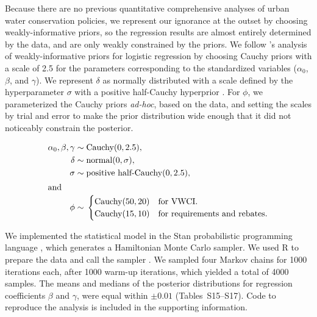 \documentclass[draft,linenumbers]{agujournal}
\begin{document}
Because there are no previous quantitative comprehensive analyses of urban
water conservation policies, we represent our ignorance at the outset by
choosing weakly-informative priors, so the regression results are almost
entirely determined by the data, and are only weakly constrained by the priors.
We follow \citet{gelman:prior:2008}'s analysis
of weakly-informative priors for logistic regression
by choosing Cauchy priors with a scale of 2.5 for the
parameters corresponding to the standardized variables ($\alpha_0$, $\beta$,
and $\gamma$).
We represent $\delta$ as normally distributed
with a scale defined by the hyperparameter $\sigma$ with a positive half-Cauchy
hyperprior \citep{gelman:prior:2008}.
For $\phi$, we parameterized the Cauchy priors
\emph{ad-hoc}, based on the data, and setting the scales by trial and error
to make the prior distribution wide enough that it did not noticeably constrain
the posterior.
\begin{linenomath*}
\begin{align}
\alpha_0, \beta, \gamma \sim{} & \text{Cauchy}(0,2.5),\\
\delta \sim{}& \text{normal}(0,\sigma),\\
\sigma \sim{}& \text{positive half-Cauchy}(0,2.5),\\
\intertext{and}
\phi \sim{}& \begin{cases}
\text{Cauchy}(50,20) & \text{for VWCI}. \\
\text{Cauchy}(15,10) & \text{for requirements and rebates}. \\
\end{cases}
\end{align}
\end{linenomath*}

We implemented the statistical model in the Stan probabilistic programming
language \citep{carpenter:stan:2016}, which generates a Hamiltonian Monte Carlo
sampler.
We used R to prepare the data and call the sampler \citep{r.manual:2016}.
We
sampled four Markov chains for 1000 iterations each, after 1000 warm-up iterations,
which yielded a total of 4000 samples.
The means and medians of the posterior distributions for
regression coefficients $\beta$ and $\gamma$, were equal within $\pm 0.01$
(Tables~S15--S17).
Code to reproduce the analysis is included in the supporting information.
\end{document}
